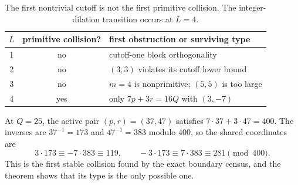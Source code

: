 \begin{table}[t]
\centering
\small
\begin{tabular}{ccl}
\toprule
$L$ & primitive collision? & first obstruction or surviving type \\
\midrule
1 & no & cutoff-one block orthogonality \\
2 & no & $(3,3)$ violates its cutoff lower bound \\
3 & no & $m=4$ is nonprimitive; $(5,5)$ is too large \\
4 & yes & only $7p+3r=16Q$ with $(3,-7)$ \\
\bottomrule
\end{tabular}
\caption{The first nontrivial cutoff is not the first primitive collision.  The
integer-dilation transition occurs at $L=4$.}
\label{tab:transition}
\end{table}

At $Q=25$, the active pair $(p,r)=(37,47)$ satisfies
$7\cdot37+3\cdot47=400$.  The inverses are $37^{-1}=173$ and
$47^{-1}=383$ modulo $400$, so the shared coordinates are
\[
 3\cdot173\equiv-7\cdot383\equiv119,
 \qquad
 -3\cdot173\equiv7\cdot383\equiv281\pmod{400}.
\]
This is the first stable collision found by the exact boundary census, and the theorem
shows that its type is the only possible one.
